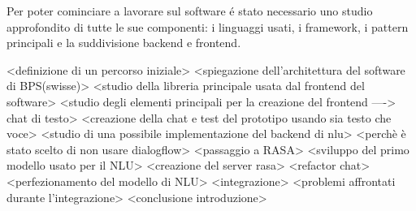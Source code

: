 Per poter cominciare a lavorare sul software \'e stato necessario uno studio approfondito di tutte le sue componenti: i linguaggi usati, i framework, i pattern principali e la suddivisione backend e frontend.

<definizione di un percorso iniziale>
<spiegazione dell'architettura del software di BPS(swisse)>
<studio della libreria principale usata dal frontend del software>
<studio degli elementi principali per la creazione del frontend ----> chat di testo>
<creazione della chat e test del prototipo usando sia testo che voce>
<studio di una possibile implementazione del backend di nlu>
<perchè è stato scelto di non usare dialogflow>
<passaggio a RASA>
<sviluppo del primo modello usato per il NLU>
<creazione del server rasa>
<refactor chat>
<perfezionamento del modello di NLU>
<integrazione>
<problemi affrontati durante l'integrazione>
<conclusione introduzione>
